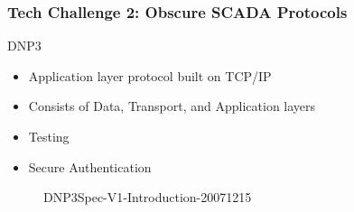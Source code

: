\begin{frame}
\frametitle{Tech Challenge 2: Obscure SCADA Protocols}
\begin{block}{DNP3}
\begin{itemize}
\item Application layer protocol built on TCP/IP
\item Consists of Data, Transport, and Application layers
\item Testing
\item Secure Authentication
\end{itemize}
\end{block}
\begin{figure}
\caption{DNP3Spec-V1-Introduction-20071215}
\end{figure}	
\end{frame}


